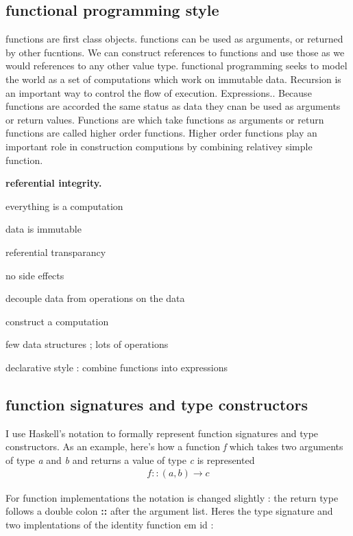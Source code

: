 \documentclass[12pt,fleqn]{article}
\newenvironment{packed_enum}{
\begin{enumerate}
 \setlength{\itemindent}{-15pt}
  \setlength{\itemsep}{1pt}
  \setlength{\parskip}{0pt}
  \setlength{\parsep}{0pt}
}{\end{enumerate}}
\begin{document}
\subsection* {functional programming style}

functions are first class objects. functions can be used as arguments, or returned by other fucntions. We can construct references to functions and use those as we would references to any other value type.
functional programming seeks to model the world as a set of computations which work on immutable data.
Recursion is  an important way to control the flow of execution.
Expressions..
Because functions are accorded the same status as data they cnan be used as arguments or return values.
Functions are which take functions as arguments or return functions are called higher order functions. 
Higher order functions play an important role in construction computions by combining relativey simple function.

{\bf referential integrity.}

\begin {packed_enum}
\item everything is a computation
\item data is immutable
\item referential transparancy
\item no side effects
\item decouple data from operations on the data
\item construct a computation
\item few data structures ; lots of operations
\item declarative style : combine functions into expressions
\end {packed_enum}

\subsection*{function signatures and type constructors}

I use Haskell's notation to formally represent function signatures and type constructors. 
As an example, here's how a function {\em f} which takes two arguments of type {\em a} and {\em b} and returns a value of type {\em c} is represented  
\begin{eqnarray*}
                              f::(a,b) \rightarrow c
\end{eqnarray*}
 
For function implementations the notation is changed slightly : the return type follows a double colon {\bf ::} after the argument list.
Heres the type signature and two implentations of the identity function {em id} :
\end{document}
